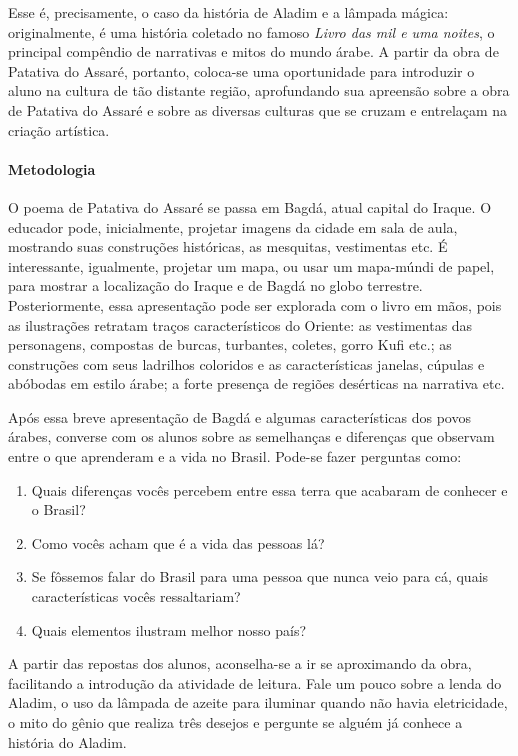 \documentclass[11pt]{extarticle}
\begin{document}
Esse é, precisamente, o caso da história de Aladim e a lâmpada mágica: originalmente, é uma história coletado no famoso \textit{Livro das mil e uma noites}, o principal compêndio de narrativas e mitos do mundo árabe. A partir da obra de Patativa do Assaré, portanto, coloca-se uma oportunidade para introduzir o aluno na cultura de tão distante região, aprofundando sua apreensão sobre a obra de Patativa do Assaré e sobre as diversas culturas que se cruzam e entrelaçam na criação artística.

\paragraph{Metodologia} O poema de Patativa do Assaré se passa em Bagdá, atual capital do Iraque. O educador pode, inicialmente, projetar imagens da cidade em sala de aula, mostrando suas construções históricas, as mesquitas, vestimentas etc. É interessante, igualmente, projetar um mapa, ou usar um mapa-múndi de papel, para mostrar a localização do Iraque e de Bagdá no globo terrestre. Posteriormente, essa apresentação pode ser explorada com o livro em mãos, pois as ilustrações retratam traços característicos do Oriente: as vestimentas das personagens, compostas de burcas, turbantes, coletes, gorro Kufi etc.; as construções com seus ladrilhos coloridos e as características janelas, cúpulas e abóbodas em estilo árabe; a forte presença de regiões desérticas na narrativa etc.

Após essa breve apresentação de Bagdá e algumas características dos povos árabes, converse com os alunos sobre as semelhanças e diferenças que observam entre o que aprenderam e a vida no Brasil. 
Pode-se fazer perguntas como:

\begin{enumerate}
\item Quais diferenças vocês percebem entre essa terra que acabaram de conhecer e o Brasil?

\item Como vocês acham que é a vida das pessoas lá? 

\item Se fôssemos falar do Brasil para uma pessoa que nunca veio para cá, quais características vocês ressaltariam?

\item Quais elementos ilustram melhor nosso país?

\end{enumerate}

A partir das repostas dos alunos, aconselha-se a ir se aproximando da obra, facilitando a introdução da atividade de leitura. Fale um pouco sobre a lenda do Aladim, o uso da lâmpada de azeite para iluminar quando não havia eletricidade, o mito do gênio que realiza três desejos e pergunte se alguém já conhece a história do Aladim.
\end{document}
